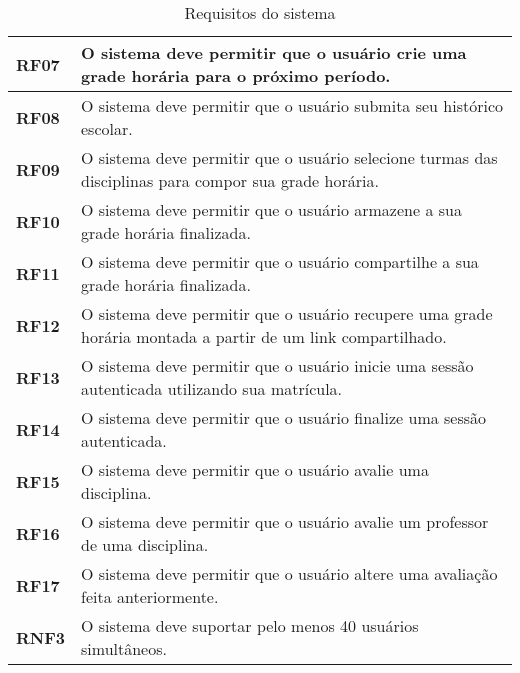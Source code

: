 \begin{table}[!ht]
    \begin{center}
        \begin{tabular}{ | m{} | p{} | }  
            \hline
            \textbf{RF07} & O sistema deve permitir que o usuário crie uma grade horária para o próximo período.\tabularnewline\hline
            \textbf{RF08} & O sistema deve permitir que o usuário submita seu histórico escolar.\tabularnewline\hline
            \textbf{RF09} & O sistema deve permitir que o usuário selecione turmas das disciplinas para compor sua grade horária.\tabularnewline\hline
            \textbf{RF10} & O sistema deve permitir que o usuário armazene a sua grade horária finalizada.\tabularnewline\hline
            \textbf{RF11} & O sistema deve permitir que o usuário compartilhe a sua grade horária finalizada. \tabularnewline\hline
            \textbf{RF12} & O sistema deve permitir que o usuário recupere uma grade horária montada a partir de um link compartilhado.\tabularnewline\hline
            
            \textbf{RF13} & O sistema deve permitir que o usuário inicie uma sessão autenticada utilizando sua matrícula.\tabularnewline\hline
            \textbf{RF14} & O sistema deve permitir que o usuário finalize uma sessão autenticada.\tabularnewline\hline
            \textbf{RF15} & O sistema deve permitir que o usuário avalie uma disciplina.\tabularnewline\hline
            \textbf{RF16} & O sistema deve permitir que o usuário avalie um professor de uma disciplina.\tabularnewline\hline
            \textbf{RF17} & O sistema deve permitir que o usuário altere uma avaliação feita anteriormente.\tabularnewline\hline

            \textbf{RNF3} & O sistema deve suportar pelo menos 40 usuários simultâneos.\tabularnewline\hline
        
        \end{tabular}
    \end{center}
    \caption{Requisitos do sistema}
    
    \label{tab:req-sistema}
\end{table}
